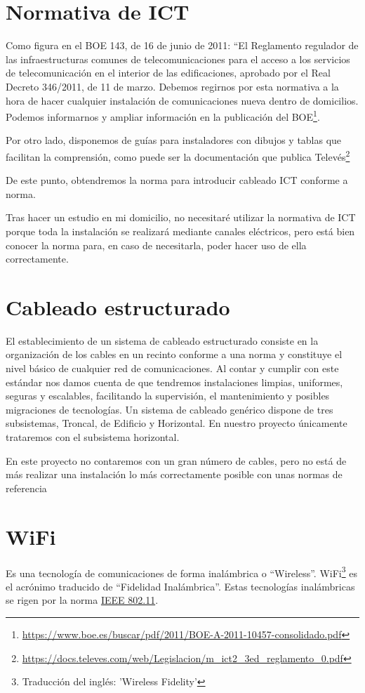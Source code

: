 \section{Normativa de ICT}
Como figura en el BOE 143, de 16 de junio de 2011: “El Reglamento regulador de las infraestructuras comunes de telecomunicaciones para el acceso a los servicios de telecomunicación en el interior de las edificaciones, aprobado por el Real Decreto 346/2011, de 11 de marzo.
Debemos regirnos por esta normativa a la hora de hacer cualquier instalación de comunicaciones nueva dentro de domicilios.
Podemos informarnos y ampliar información en la publicación del BOE\footnote{\url{https://www.boe.es/buscar/pdf/2011/BOE-A-2011-10457-consolidado.pdf}}.

Por otro lado, disponemos de guías para instaladores con dibujos y tablas que facilitan la comprensión, como puede ser la documentación que publica Televés\footnote{\url{https://docs.televes.com/web/Legislacion/m_ict2_3ed_reglamento_0.pdf}}

De este punto, obtendremos la norma para introducir cableado ICT conforme a norma.

Tras hacer un estudio en mi domicilio, no necesitaré utilizar la normativa de ICT porque toda la instalación se realizará mediante canales eléctricos, pero está bien conocer la norma para, en caso de necesitarla, poder hacer uso de ella correctamente.

\section{Cableado estructurado}
El establecimiento de un sistema de cableado estructurado consiste en la organización de los cables en un recinto conforme a una norma y constituye el nivel básico de cualquier red de comunicaciones.
Al contar y cumplir con este estándar nos damos cuenta de que tendremos instalaciones limpias, uniformes, seguras y escalables, facilitando la supervisión, el mantenimiento y posibles migraciones de tecnologías.
Un sistema de cableado genérico dispone de tres subsistemas, Troncal, de Edificio y Horizontal. En nuestro proyecto únicamente trataremos con el subsistema horizontal.

En este proyecto no contaremos con un gran número de cables, pero no está de más realizar una instalación lo más correctamente posible con unas normas de referencia

\section{WiFi}
Es una tecnología de comunicaciones de forma inalámbrica o “Wireless”. WiFi\footnote{Traducción del inglés: 'Wireless Fidelity'} es el acrónimo traducido de “Fidelidad Inalámbrica”.
Estas tecnologías inalámbricas se rigen por la norma \underline{IEEE 802.11}.

